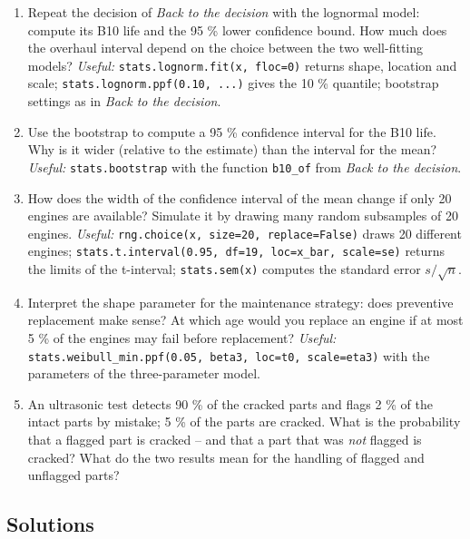 \documentclass[
  letterpaper,
  DIV=11,
  numbers=noendperiod]{scrreprt}
\providecommand{\tightlist}{%
  \setlength{\itemsep}{0pt}\setlength{\parskip}{0pt}}\usepackage{longtable,booktabs,array}
\begin{document}
\begin{enumerate}
\def\labelenumi{\arabic{enumi}.}
\tightlist
\item
  Repeat the decision of \emph{Back to the decision} with the lognormal
  model: compute its B10 life and the 95 \% lower confidence bound. How
  much does the overhaul interval depend on the choice between the two
  well-fitting models? \emph{Useful:}
  \texttt{stats.lognorm.fit(x,\ floc=0)} returns shape, location and
  scale; \texttt{stats.lognorm.ppf(0.10,\ ...)} gives the 10 \%
  quantile; bootstrap settings as in \emph{Back to the decision}.
\item
  Use the bootstrap to compute a 95 \% confidence interval for the B10
  life. Why is it wider (relative to the estimate) than the interval for
  the mean? \emph{Useful:} \texttt{stats.bootstrap} with the function
  \texttt{b10\_of} from \emph{Back to the decision}.
\item
  How does the width of the confidence interval of the mean change if
  only 20 engines are available? Simulate it by drawing many random
  subsamples of 20 engines. \emph{Useful:}
  \texttt{rng.choice(x,\ size=20,\ replace=False)} draws 20 different
  engines;
  \texttt{stats.t.interval(0.95,\ df=19,\ loc=x\_bar,\ scale=se)}
  returns the limits of the t-interval; \texttt{stats.sem(x)} computes
  the standard error \(s/\sqrt n\).
\item
  Interpret the shape parameter for the maintenance strategy: does
  preventive replacement make sense? At which age would you replace an
  engine if at most 5 \% of the engines may fail before replacement?
  \emph{Useful:}
  \texttt{stats.weibull\_min.ppf(0.05,\ beta3,\ loc=t0,\ scale=eta3)}
  with the parameters of the three-parameter model.
\item
  An ultrasonic test detects 90 \% of the cracked parts and flags 2 \%
  of the intact parts by mistake; 5 \% of the parts are cracked. What is
  the probability that a flagged part is cracked -- and that a part that
  was \emph{not} flagged is cracked? What do the two results mean for
  the handling of flagged and unflagged parts?
\end{enumerate}

\subsection{Solutions}\label{solutions-3}
\end{document}
